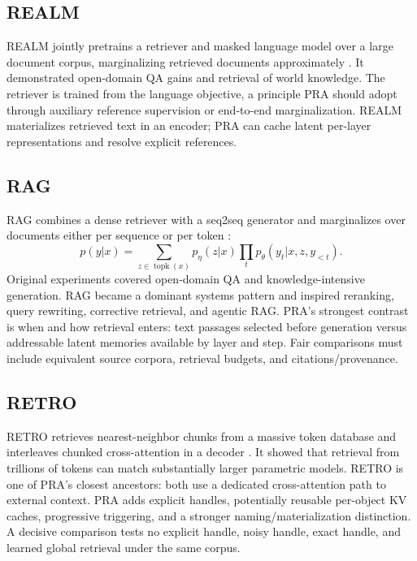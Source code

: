 \documentclass[10pt,a4paper]{article}
\begin{document}
\subsection{REALM}
REALM jointly pretrains a retriever and masked language model over a large document corpus, marginalizing retrieved documents approximately \citep{guu2020realm}. It demonstrated open-domain QA gains and retrieval of world knowledge. The retriever is trained from the language objective, a principle PRA should adopt through auxiliary reference supervision or end-to-end marginalization. REALM materializes retrieved text in an encoder; PRA can cache latent per-layer representations and resolve explicit references.

\subsection{RAG}
RAG combines a dense retriever with a seq2seq generator and marginalizes over documents either per sequence or per token \citep{lewis2020rag}:
\begin{equation}
p(y|x)=\sum_{z\in\operatorname{topk}(x)}p_\eta(z|x)\prod_t p_\theta(y_t|x,z,y_{<t}).
\end{equation}
Original experiments covered open-domain QA and knowledge-intensive generation. RAG became a dominant systems pattern and inspired reranking, query rewriting, corrective retrieval, and agentic RAG. PRA's strongest contrast is when and how retrieval enters: text passages selected before generation versus addressable latent memories available by layer and step. Fair comparisons must include equivalent source corpora, retrieval budgets, and citations/provenance.

\subsection{RETRO}
RETRO retrieves nearest-neighbor chunks from a massive token database and interleaves chunked cross-attention in a decoder \citep{borgeaud2022retro}. It showed that retrieval from trillions of tokens can match substantially larger parametric models. RETRO is one of PRA's closest ancestors: both use a dedicated cross-attention path to external context. PRA adds explicit handles, potentially reusable per-object KV caches, progressive triggering, and a stronger naming/materialization distinction. A decisive comparison tests no explicit handle, noisy handle, exact handle, and learned global retrieval under the same corpus.
\end{document}
